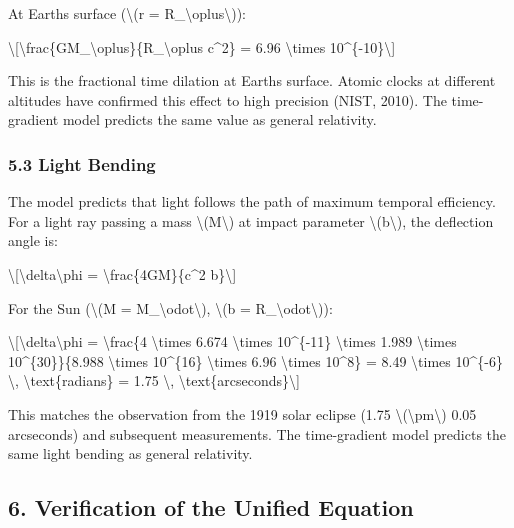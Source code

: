 \documentclass[
  10pt,
]{article}
\begin{document}
At Earth\textquotesingle s surface (\textbackslash(r =
R\_\textbackslash oplus\textbackslash)):

\textbackslash{[}\textbackslash frac\{GM\_\textbackslash oplus\}\{R\_\textbackslash oplus
c\^{}2\} = 6.96 \textbackslash times 10\^{}\{-10\}\textbackslash{]}

This is the fractional time dilation at Earth\textquotesingle s surface.
Atomic clocks at different altitudes have confirmed this effect to high
precision (NIST, 2010). The time-gradient model predicts the same value
as general relativity.

\hypertarget{light-bending}{%
\subsubsection{5.3 Light Bending}\label{light-bending}}

The model predicts that light follows the path of maximum temporal
efficiency. For a light ray passing a mass
\textbackslash(M\textbackslash) at impact parameter
\textbackslash(b\textbackslash), the deflection angle is:

\textbackslash{[}\textbackslash delta\textbackslash phi =
\textbackslash frac\{4GM\}\{c\^{}2 b\}\textbackslash{]}

For the Sun (\textbackslash(M = M\_\textbackslash odot\textbackslash),
\textbackslash(b = R\_\textbackslash odot\textbackslash)):

\textbackslash{[}\textbackslash delta\textbackslash phi =
\textbackslash frac\{4 \textbackslash times 6.674 \textbackslash times
10\^{}\{-11\} \textbackslash times 1.989 \textbackslash times
10\^{}\{30\}\}\{8.988 \textbackslash times 10\^{}\{16\}
\textbackslash times 6.96 \textbackslash times 10\^{}8\} = 8.49
\textbackslash times 10\^{}\{-6\} \textbackslash,
\textbackslash text\{radians\} = 1.75 \textbackslash,
\textbackslash text\{arcseconds\}\textbackslash{]}

This matches the observation from the 1919 solar eclipse (1.75
\textbackslash(\textbackslash pm\textbackslash) 0.05 arcseconds) and
subsequent measurements. The time-gradient model predicts the same light
bending as general relativity.

\hypertarget{verification-of-the-unified-equation}{%
\subsection{6. Verification of the Unified
Equation}\label{verification-of-the-unified-equation}}
\end{document}
